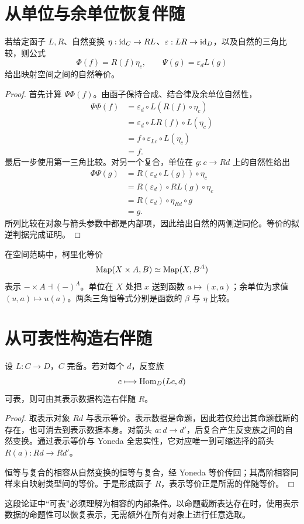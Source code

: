 \section{从单位与余单位恢复伴随}
\begin{theorem}[伴随的单位余单位判据]
若给定函子 $L,R$、自然变换 $\eta:\operatorname{id}_C\to RL$、$\varepsilon:LR\to\operatorname{id}_D$，以及自然的三角比较，则公式
\[
\Phi(f)=R(f)\eta_c,
\qquad
\Psi(g)=\varepsilon_dL(g)
\]
给出映射空间之间的自然等价。
\end{theorem}
\begin{proof}
首先计算 $\Psi\Phi(f)$。由函子保持合成、结合律及余单位自然性，
\begin{align*}
\Psi\Phi(f)
&=\varepsilon_d\circ L(R(f)\circ\eta_c)\\
&=\varepsilon_d\circ LR(f)\circ L(\eta_c)\\
&=f\circ\varepsilon_{Lc}\circ L(\eta_c)\\
&=f.
\end{align*}
最后一步使用第一三角比较。对另一个复合，单位在 $g:c\to Rd$ 上的自然性给出
\begin{align*}
\Phi\Psi(g)
&=R(\varepsilon_d\circ L(g))\circ\eta_c\\
&=R(\varepsilon_d)\circ RL(g)\circ\eta_c\\
&=R(\varepsilon_d)\circ\eta_{Rd}\circ g\\
&=g.
\end{align*}
所列比较在对象与箭头参数中都是内部项，因此给出自然的两侧逆同伦。等价的拟逆判据完成证明。
\end{proof}
\begin{example}[乘积与函数空间]
在空间范畴中，柯里化等价
\[
\operatorname{Map}(X\times A,B)\simeq\operatorname{Map}(X,B^A)
\]
表示 $-\times A\dashv(-)^A$。单位在 $X$ 处把 $x$ 送到函数 $a\mapsto(x,a)$；余单位为求值 $(u,a)\mapsto u(a)$。两条三角恒等式分别是函数的 $\beta$ 与 $\eta$ 比较。
\end{example}

\section{从可表性构造右伴随}
\begin{proposition}
设 $L:C\to D$，$C$ 完备。若对每个 $d$，反变族
\[
c\longmapsto\operatorname{Hom}_D(Lc,d)
\]
可表，则可由其表示数据构造右伴随 $R$。
\end{proposition}
\begin{proof}
取表示对象 $Rd$ 与表示等价。表示数据是命题，因此若仅给出其命题截断的存在，也可消去到表示数据本身。对箭头 $a:d\to d'$，后复合产生反变族之间的自然变换。通过表示等价与 Yoneda 全忠实性，它对应唯一到可缩选择的箭头 $R(a):Rd\to Rd'$。

恒等与复合的相容从自然变换的恒等与复合，经 Yoneda 等价传回；其高阶相容同样来自映射类型间的等价。于是形成函子 $R$，表示等价正是所需的伴随等价。
\end{proof}
\begin{remark}
这段论证中“可表”必须理解为相容的内部条件。以命题截断表达存在时，使用表示数据的命题性可以恢复表示，无需额外在所有对象上进行任意选取。
\end{remark}

